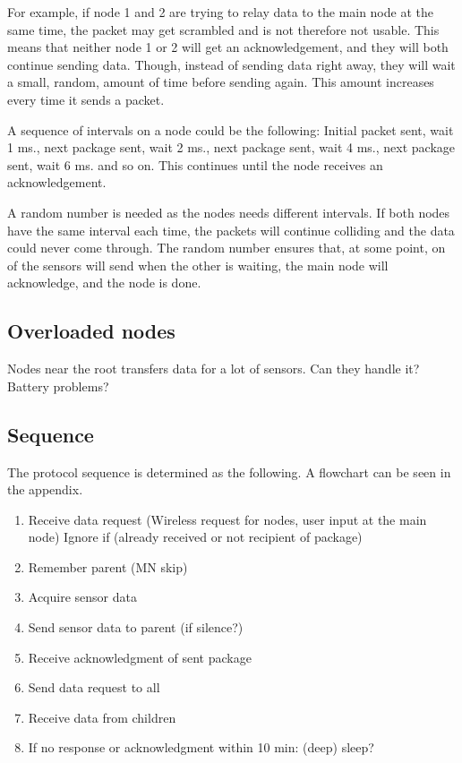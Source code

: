 For example, if node 1 and 2 are trying to relay data to the main node at the same time, the packet may get scrambled and is not therefore not usable. This means that neither node 1 or 2 will get an acknowledgement, and they will both continue sending data. Though, instead of sending data right away, they will wait a small, random, amount of time before sending again. This amount increases every time it sends a packet. 

A sequence of intervals on a node could be the following: Initial packet sent, wait 1 ms., next package sent, wait 2 ms.,  next package sent, wait 4 ms., next package sent, wait 6 ms. and so on. This continues until the node receives an acknowledgement.

A random number is needed as the nodes needs different intervals. If both nodes have the same interval each time, the packets will continue colliding and the data could never come through. The random number ensures that, at some point, on of the sensors will send when the other is waiting, the main node will acknowledge, and the node is done. 

\subsection{Overloaded nodes}
Nodes near the root transfers data for a lot of sensors. Can they handle it? Battery problems?

\subsection{Sequence}
The protocol sequence is determined as the following. A flowchart can be seen in the appendix.
\begin{enumerate}
	\item Receive data request (Wireless request for nodes, user input at the main node)
		\subitem Ignore if (already received or not recipient of package)
	\item Remember parent (MN skip)
	\item Acquire sensor data
	\item Send sensor data to parent (if silence?)
	\item Receive acknowledgment of sent package
	\item Send data request to all
	\item Receive data from children
	\item If no response or acknowledgment within 10 min: (deep) sleep?
\end{enumerate}

